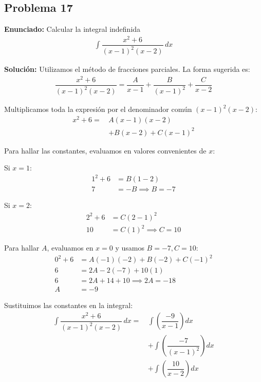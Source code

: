 \subsection*{Problema 17}

\textbf{Enunciado:} Calcular la integral indefinida
\begin{align*}
\int \dfrac{x^2 + 6}{(x - 1)^2 (x - 2)} \, dx
\end{align*}

\textbf{Solución:} 
Utilizamos el método de fracciones parciales. La forma sugerida es:
\begin{align*}
\dfrac{x^2 + 6}{(x - 1)^2 (x - 2)} = \dfrac{A}{x - 1} + \dfrac{B}{(x - 1)^2} + \dfrac{C}{x - 2}
\end{align*}

Multiplicamos toda la expresión por el denominador común $(x - 1)^2 (x - 2)$:
\begin{align*}
x^2 + 6 = \, & A(x - 1)(x - 2) \\
& + B(x - 2) + C(x - 1)^2
\end{align*}

Para hallar las constantes, evaluamos en valores convenientes de $x$:

Si $x = 1$:
\begin{align*}
1^2 + 6 &= B(1 - 2) \\
7 &= -B \implies B = -7
\end{align*}

Si $x = 2$:
\begin{align*}
2^2 + 6 &= C(2 - 1)^2 \\
10 &= C(1)^2 \implies C = 10
\end{align*}

Para hallar $A$, evaluamos en $x = 0$ y usamos $B = -7, C = 10$:
\begin{align*}
0^2 + 6 &= A(-1)(-2) + B(-2) + C(-1)^2 \\
6 &= 2A - 2(-7) + 10(1) \\
6 &= 2A + 14 + 10 \implies 2A = -18 \\
A &= -9
\end{align*}

Sustituimos las constantes en la integral:
\begin{align*}
\int \dfrac{x^2 + 6}{(x - 1)^2 (x - 2)} \, dx = \, & \int \left( \dfrac{-9}{x - 1} \right) dx \\
& + \int \left( \dfrac{-7}{(x - 1)^2} \right) dx \\
& + \int \left( \dfrac{10}{x - 2} \right) dx
\end{align*}

